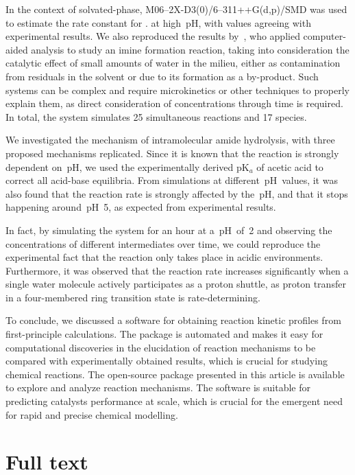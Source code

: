 In the context of solvated-phase,
M06--2X-D3(0)/6--311++G(d,p)/SMD was used to estimate the rate constant for .
at high~pH,
with values agreeing with experimental results.
We also reproduced the results by~\citeauthor{P_rez_Soto_2020},
who applied computer-aided analysis
to study an imine formation reaction,
taking into consideration the catalytic effect of small amounts of water in the milieu,
either as contamination from residuals in the solvent
or due to its formation as a by-product.
Such systems can be complex and require microkinetics or other techniques to properly explain them,
as direct consideration of concentrations through time is required.
In total,
the system simulates 25 simultaneous reactions and 17 species.

We investigated the mechanism of intramolecular amide hydrolysis,
with three proposed mechanisms replicated.
Since it is known that the reaction is strongly dependent on~pH,
we used the experimentally derived pK$_a$ of acetic acid to correct all acid-base equilibria.
From simulations at different~pH~values,
it was also found that the reaction rate is strongly affected by the~pH,
and that it stops happening around~pH~5,
as expected from experimental results.

In fact,
by simulating the system for an hour at a~pH~of~2
and observing the concentrations of different intermediates over time,
we could reproduce the experimental fact that
the reaction only takes place in acidic environments.
Furthermore,
it was observed that the reaction rate increases significantly when
a single water molecule actively participates as a proton shuttle,
as proton transfer in a four-membered ring transition state is rate-determining.

To conclude,
we discussed a software for obtaining reaction kinetic profiles from first-principle calculations.
The package is automated and makes it easy for computational discoveries in the elucidation of reaction mechanisms
to be compared with experimentally obtained results,
which is crucial for studying chemical reactions.
The open-source package presented in this article is available to explore and analyze reaction mechanisms.
The software is suitable for predicting catalysts performance at scale,
which is crucial for the emergent need for rapid and precise chemical modelling.

\section{Full text}

